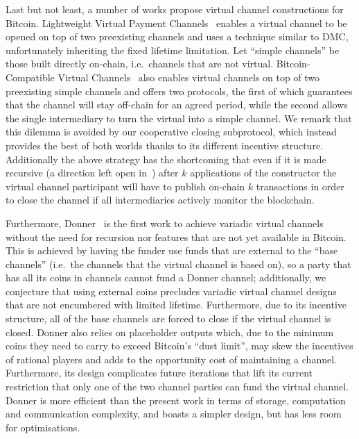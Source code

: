   Last but not least, a number of works propose virtual channel constructions
  for Bitcoin. Lightweight Virtual Payment
  Channels~\cite{10.1007/978-3-030-65411-5_18} enables a virtual channel to be
  opened on top of two preexisting channels and uses a technique similar to DMC,
  unfortunately inheriting the fixed lifetime limitation.
  Let ``simple channels'' be those built directly on-chain, i.e.\ channels that are not
  virtual.
  Bitcoin-Compatible Virtual Channels~\cite{cryptoeprint:2020:554} also enables
  virtual channels on top of two preexisting simple channels
  and offers two protocols, the first of which guarantees that the channel will
  stay off-chain for an agreed period, while the second allows the single intermediary
  to turn the virtual into a simple channel.
  We remark that this dilemma is avoided by our cooperative closing subprotocol,
  which instead provides the best of both worlds thanks to its different incentive
  structure. Additionally the above strategy has the shortcoming that even if it is made
  recursive (a direction left open in~\cite{cryptoeprint:2020:554}) after $k$
  applications of the constructor the virtual channel participant will have to
  publish on-chain $k$ transactions in order to close the channel if all
  intermediaries actively monitor the blockchain.

  Furthermore, Donner~\cite{donner} is the first work to achieve variadic
  virtual channels without the need for recursion nor features that are not yet
  available in Bitcoin. This is achieved by having the funder use funds that are
  external to the ``base channels'' (i.e.\ the channels that the virtual channel
  is based on), so a party that has all its coins in channels cannot fund a
  Donner channel; additionally, we conjecture that using external coins
  precludes variadic virtual channel designs that are not encumbered with
  limited lifetime. Furthermore, due to its incentive structure, all of the
  base channels are forced to close if the virtual channel is closed.
  Donner also relies on placeholder outputs
  which, due to the minimum coins they need to carry to exceed Bitcoin's ``dust
  limit'', may skew the incentives of rational players and adds to the
  opportunity cost of maintaining a channel. Furthermore, its design complicates
  future iterations that lift its current restriction that only one of the two
  channel parties can fund the virtual channel. Donner is more efficient than
  the present work in terms of storage, computation and communication
  complexity, and boasts a simpler design, but has less room for optimisations.

